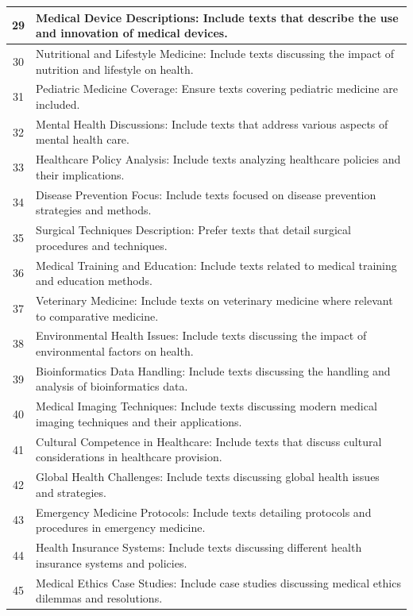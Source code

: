 \documentclass{article}
\begin{document}
\begin{longtable}{c|p{14cm}}
\hline
29 & Medical Device Descriptions: Include texts that describe the use and innovation of medical devices. \\
\hline
30 & Nutritional and Lifestyle Medicine: Include texts discussing the impact of nutrition and lifestyle on health. \\
\hline
31 & Pediatric Medicine Coverage: Ensure texts covering pediatric medicine are included. \\
\hline
32 & Mental Health Discussions: Include texts that address various aspects of mental health care. \\
\hline
33 & Healthcare Policy Analysis: Include texts analyzing healthcare policies and their implications. \\
\hline
34 & Disease Prevention Focus: Include texts focused on disease prevention strategies and methods. \\
\hline
35 & Surgical Techniques Description: Prefer texts that detail surgical procedures and techniques. \\
\hline
36 & Medical Training and Education: Include texts related to medical training and education methods. \\
\hline
37 & Veterinary Medicine: Include texts on veterinary medicine where relevant to comparative medicine. \\
\hline
38 & Environmental Health Issues: Include texts discussing the impact of environmental factors on health. \\
\hline
39 & Bioinformatics Data Handling: Include texts discussing the handling and analysis of bioinformatics data. \\
\hline
40 & Medical Imaging Techniques: Include texts discussing modern medical imaging techniques and their applications. \\
\hline
41 & Cultural Competence in Healthcare: Include texts that discuss cultural considerations in healthcare provision. \\
\hline
42 & Global Health Challenges: Include texts discussing global health issues and strategies. \\
\hline
43 & Emergency Medicine Protocols: Include texts detailing protocols and procedures in emergency medicine. \\
\hline
44 & Health Insurance Systems: Include texts discussing different health insurance systems and policies. \\
\hline
45 & Medical Ethics Case Studies: Include case studies discussing medical ethics dilemmas and resolutions. \\

\end{longtable}
\end{document}
